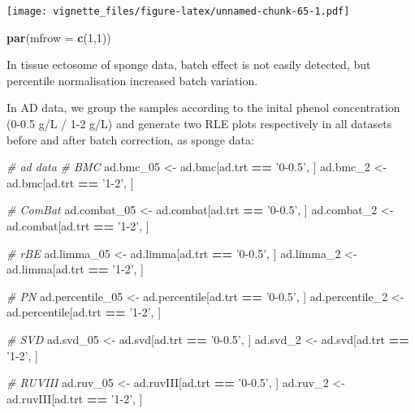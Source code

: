 \documentclass[]{book}
\newenvironment{Shaded}{\begin{snugshade}}{\end{snugshade}}
\newcommand{\KeywordTok}[1]{\textcolor[rgb]{0.13,0.29,0.53}{\textbf{#1}}}
\newcommand{\DataTypeTok}[1]{\textcolor[rgb]{0.13,0.29,0.53}{#1}}
\newcommand{\DecValTok}[1]{\textcolor[rgb]{0.00,0.00,0.81}{#1}}
\newcommand{\StringTok}[1]{\textcolor[rgb]{0.31,0.60,0.02}{#1}}
\newcommand{\CommentTok}[1]{\textcolor[rgb]{0.56,0.35,0.01}{\textit{#1}}}
\newcommand{\OperatorTok}[1]{\textcolor[rgb]{0.81,0.36,0.00}{\textbf{#1}}}
\newcommand{\NormalTok}[1]{#1}
\begin{document}
\texttt{[image: vignette\_files/figure-latex/unnamed-chunk-65-1.pdf]}

\begin{Shaded}
\begin{Highlighting}[]
\KeywordTok{par}\NormalTok{(}\DataTypeTok{mfrow =} \KeywordTok{c}\NormalTok{(}\DecValTok{1}\NormalTok{,}\DecValTok{1}\NormalTok{))}
\end{Highlighting}
\end{Shaded}

In tissue ectosome of sponge data, batch effect is not easily detected,
but percentile normalisation increased batch variation.

In AD data, we group the samples according to the inital phenol
concentration (0-0.5 g/L / 1-2 g/L) and generate two RLE plots
respectively in all datasets before and after batch correction, as
sponge data:

\begin{Shaded}
\begin{Highlighting}[]
\CommentTok{# ad data}
\CommentTok{# BMC}
\NormalTok{ad.bmc_}\DecValTok{05}\NormalTok{ <-}\StringTok{ }\NormalTok{ad.bmc[ad.trt }\OperatorTok{==}\StringTok{ '0-0.5'}\NormalTok{, ]}
\NormalTok{ad.bmc_}\DecValTok{2}\NormalTok{ <-}\StringTok{ }\NormalTok{ad.bmc[ad.trt }\OperatorTok{==}\StringTok{ '1-2'}\NormalTok{, ]}

\CommentTok{# ComBat}
\NormalTok{ad.combat_}\DecValTok{05}\NormalTok{ <-}\StringTok{ }\NormalTok{ad.combat[ad.trt }\OperatorTok{==}\StringTok{ '0-0.5'}\NormalTok{, ]}
\NormalTok{ad.combat_}\DecValTok{2}\NormalTok{ <-}\StringTok{ }\NormalTok{ad.combat[ad.trt }\OperatorTok{==}\StringTok{ '1-2'}\NormalTok{, ]}

\CommentTok{# rBE}
\NormalTok{ad.limma_}\DecValTok{05}\NormalTok{ <-}\StringTok{ }\NormalTok{ad.limma[ad.trt }\OperatorTok{==}\StringTok{ '0-0.5'}\NormalTok{, ]}
\NormalTok{ad.limma_}\DecValTok{2}\NormalTok{ <-}\StringTok{ }\NormalTok{ad.limma[ad.trt }\OperatorTok{==}\StringTok{ '1-2'}\NormalTok{, ]}

\CommentTok{# PN}
\NormalTok{ad.percentile_}\DecValTok{05}\NormalTok{ <-}\StringTok{ }\NormalTok{ad.percentile[ad.trt }\OperatorTok{==}\StringTok{ '0-0.5'}\NormalTok{, ]}
\NormalTok{ad.percentile_}\DecValTok{2}\NormalTok{ <-}\StringTok{ }\NormalTok{ad.percentile[ad.trt }\OperatorTok{==}\StringTok{ '1-2'}\NormalTok{, ]}

\CommentTok{# SVD}
\NormalTok{ad.svd_}\DecValTok{05}\NormalTok{ <-}\StringTok{ }\NormalTok{ad.svd[ad.trt }\OperatorTok{==}\StringTok{ '0-0.5'}\NormalTok{, ]}
\NormalTok{ad.svd_}\DecValTok{2}\NormalTok{ <-}\StringTok{ }\NormalTok{ad.svd[ad.trt }\OperatorTok{==}\StringTok{ '1-2'}\NormalTok{, ]}

\CommentTok{# RUVIII}
\NormalTok{ad.ruv_}\DecValTok{05}\NormalTok{ <-}\StringTok{ }\NormalTok{ad.ruvIII[ad.trt }\OperatorTok{==}\StringTok{ '0-0.5'}\NormalTok{, ]}
\NormalTok{ad.ruv_}\DecValTok{2}\NormalTok{ <-}\StringTok{ }\NormalTok{ad.ruvIII[ad.trt }\OperatorTok{==}\StringTok{ '1-2'}\NormalTok{, ]}
\end{Highlighting}
\end{Shaded}
\end{document}
